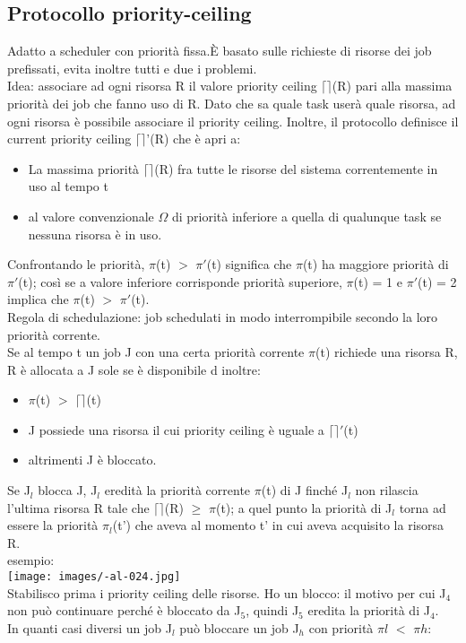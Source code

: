 \documentclass{article}
\begin{document}
\subsection{Protocollo priority-ceiling}
Adatto a scheduler con priorità fissa.È basato sulle richieste di risorse dei job prefissati, evita inoltre tutti e due i problemi.\\ Idea: associare ad ogni risorsa R il valore priority ceiling $\lceil\rceil$(R) pari alla massima priorità dei job che fanno uso di R. Dato che sa quale task userà quale risorsa, ad ogni risorsa è possibile associare il priority ceiling. Inoltre, il protocollo definisce il current priority ceiling $\lceil\rceil$'(R) che è apri a:
\begin{itemize}
\item La massima priorità $\lceil\rceil$(R) fra tutte le risorse del sistema correntemente in uso al tempo t
\item al valore convenzionale $\Omega$ di priorità  inferiore a quella di qualunque task se nessuna risorsa è in uso.
\end{itemize}
Confrontando le priorità, $\pi$(t) $>$ $\pi'$(t) significa che $\pi$(t) ha maggiore priorità di $\pi'$(t); così se a valore inferiore corrisponde priorità superiore, $\pi$(t) = 1 e $\pi'$(t) = 2 implica che $\pi$(t) $>$ $\pi'$(t).\\ Regola di schedulazione: job schedulati in modo interrompibile secondo la loro priorità corrente.\\ Se al tempo t un job J con una certa priorità corrente $\pi$(t) richiede una risorsa R, R è allocata a J sole se è disponibile d inoltre:
\begin{itemize}
\item $\pi$(t) $>$ $\lceil\rceil$(t)
\item J possiede una risorsa il cui priority ceiling è uguale a $\lceil\rceil'$(t)
\item altrimenti J è bloccato.
\end{itemize}
Se J$_{l}$ blocca J, J$_{l}$ eredità la priorità corrente $\pi$(t) di J finché J$_{l}$ non rilascia l'ultima risorsa R tale che $\lceil\rceil$(R) $\geq$ $\pi$(t); a quel punto la priorità di J$_{l}$ torna ad essere la priorità $\pi_{l}$(t') che aveva al momento t' in cui aveva acquisito la risorsa R.\\ esempio:\\
\texttt{[image: images/-al-024.jpg]}\\
Stabilisco prima i priority ceiling delle risorse. Ho un blocco: il motivo per cui J$_{4}$ non può continuare perché è bloccato da J$_{5}$, quindi J$_{5}$ eredita la priorità di J$_{4}$.\\ In quanti casi diversi un job J$_{l}$ può bloccare un job J$_{h}$ con priorità $\pi{l}$ $<$ $\pi{h}$:
\end{document}
